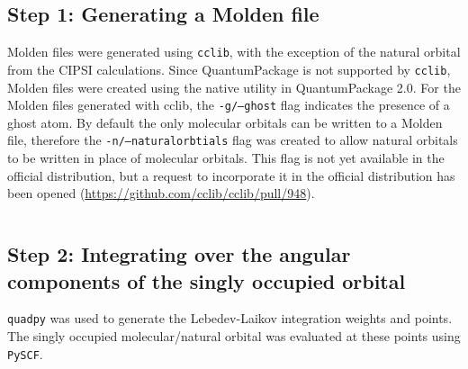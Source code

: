 \subsection{Step 1: Generating a Molden file}
Molden files were generated using \texttt{cclib}, with the exception of the natural orbital from the CIPSI calculations. 
Since QuantumPackage is not supported by \texttt{cclib}, Molden files were created using the native utility in QuantumPackage 2.0. 
For the Molden files generated with cclib, the \texttt{-g/--ghost} flag indicates the presence of a ghost atom.
By default the only molecular orbitals can be written to a Molden file, therefore the \texttt{-n/--naturalorbtials} flag was created to allow natural orbitals to be written in place of molecular orbitals.
This flag is not yet available in the official distribution, but a request to incorporate it in the official distribution has been opened (\url{https://github.com/cclib/cclib/pull/948}).

%
\inputminted{zsh}{parts/cclibmolden.sh}

\subsection{Step 2: Integrating over the angular components of the singly occupied orbital}

\texttt{quadpy} was used to generate the Lebedev-Laikov integration weights and points.
The singly occupied molecular/natural orbital was evaluated at these points using \texttt{PySCF}.

%
\inputminted{python}{parts/anionradialint.py}

